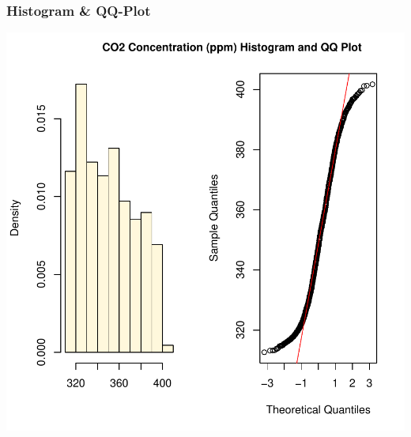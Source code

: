 \documentclass[11pt, a4paper]{article} %
\begin{document}
\subsubsection{Histogram \& QQ-Plot}

\includegraphics{alleselena-fig1check}
\end{document}
